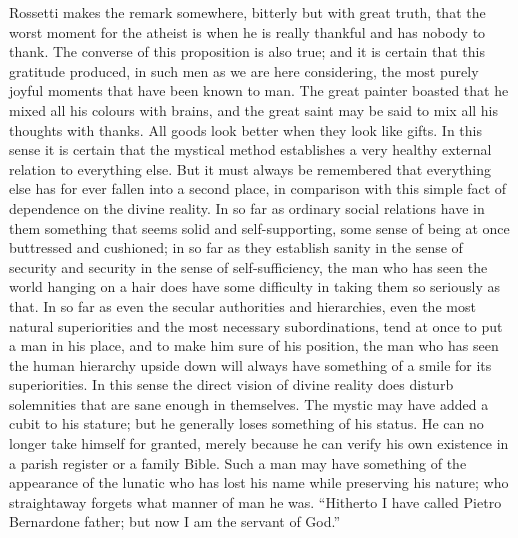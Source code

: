 \documentclass{book}
\begin{document}
Rossetti makes the remark somewhere, bitterly but with great truth, that the worst moment for the atheist is when he is really thankful and has nobody to thank. The converse of this proposition is also true; and it is certain that this gratitude produced, in such men as we are here considering, the most purely joyful moments that have been known to man. The great painter boasted that he mixed all his colours with brains, and the great saint may be said to mix all his thoughts with thanks. All goods look better when they look like gifts. In this sense it is certain that the mystical method establishes a very healthy external relation to everything else. But it must always be remembered that everything else has for ever fallen into a second place, in comparison with this simple fact of dependence on the divine reality. In so far as ordinary social relations have in them something that seems solid and self-supporting, some sense of being at once buttressed and cushioned; in so far as they establish sanity in the sense of security and security in the sense of self-sufficiency, the man who has seen the world hanging on a hair does have some difficulty in taking them so seriously as that. In so far as even the secular authorities and hierarchies, even the most natural superiorities and the most necessary subordinations, tend at once to put a man in his place, and to make him sure of his position, the man who has seen the human hierarchy upside down will always have something of a smile for its superiorities. In this sense the direct vision of divine reality does disturb solemnities that are sane enough in themselves. The mystic may have added a cubit to his stature; but he generally loses something of his status. He can no longer take himself for granted, merely because he can verify his own existence in a parish register or a family Bible. Such a man may have something of the appearance of the lunatic who has lost his name while preserving his nature; who straightaway forgets what manner of man he was. “Hitherto I have called Pietro Bernardone father; but now I am the servant of God.”
\end{document}
